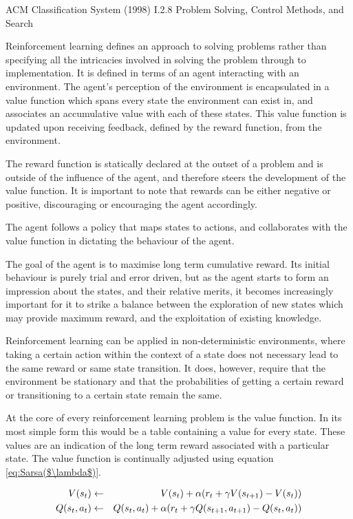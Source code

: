 \documentclass{rucsthesis}
\begin{document}
ACM Classification System (1998) I.2.8 Problem Solving, Control Methods, and Search

Reinforcement learning defines an approach to solving problems rather than specifying all the intricacies involved in solving the problem through to implementation. It is defined in terms of an agent interacting with an environment. The agent's perception of the environment is encapsulated in a value function which spans every state the environment can exist in, and associates an accumulative value with each of these states. This value function is updated upon receiving feedback, defined by the reward function, from the environment. 

The reward function is statically declared at the outset of a problem and is outside of the influence of the agent, and therefore steers the development of the value function. It is important to note that rewards can be either negative or positive, discouraging or encouraging the agent accordingly. 

The agent follows a policy that maps states to actions, and collaborates with the value function in dictating the behaviour of the agent\citep{suttonbarto}.

The goal of the agent is to maximise long term cumulative reward. Its initial behaviour is purely trial and error driven, but as the agent starts to form an impression about the states, and their relative merits, it becomes increasingly important for it to strike a balance between the exploration of new states which may provide maximum reward, and the exploitation of existing knowledge\citep{suttonbarto}.

Reinforcement learning can be applied in non-deterministic environments, where taking a certain action within the context of a state does not necessary lead to the same reward or same state transition. It does, however, require that the environment be stationary and that the probabilities of getting a certain reward or transitioning to a certain state remain the same\citep{kaelbling96reinforcement}. 

At the core of every reinforcement learning problem is the value function. In its most simple form this would be a table containing a value for every state. These values are an indication of the long term reward associated with a particular state. The value function is continually adjusted using equation \ref{eq:Sarsa($\lambda$)}. 

\begin{eqnarray}
\centering
V(s_t) & \leftarrow & V(s_t) + \alpha(r_{t} + \gamma V(s_{t+1}) - V(s_t)) \label{eq:astates} \\
Q(s_t,a_t) & \leftarrow & Q(s_t,a_t) + \alpha(r_{t} + \gamma Q(s_{t+1},a_{t+1}) - Q(s_t,a_t)) \label{eq:Sarsa($\lambda$)}
\end{eqnarray}
\end{document}
